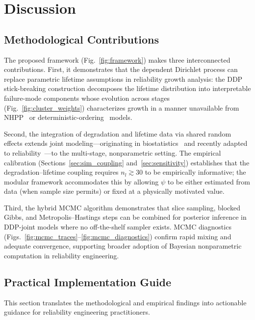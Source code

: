 \documentclass[a4paper,fleqn,longmktitle]{cas-sc}
\begin{document}
\section{Discussion}
\label{sec:disc}

\subsection{Methodological Contributions}

The proposed framework (Fig.~\ref{fig:framework}) makes three interconnected contributions. First, it demonstrates that the dependent Dirichlet process can replace parametric lifetime assumptions in reliability growth analysis: the DDP stick-breaking construction decomposes the lifetime distribution into interpretable failure-mode components whose evolution across stages (Fig.~\ref{fig:cluster_weights}) characterizes growth in a manner unavailable from NHPP~\cite{Crow1984} or deterministic-ordering~\cite{Liu2026a} models.

Second, the integration of degradation and lifetime data via shared random effects extends joint modeling---originating in biostatistics~\cite{Tsiatis2004,Rizopoulos2012} and recently adapted to reliability~\cite{Fu2024,Fard2025}---to the multi-stage, nonparametric setting. The empirical calibration (Sections~\ref{sec:sim_coupling} and~\ref{sec:sensitivity}) establishes that the degradation--lifetime coupling requires $n_l \gtrsim 30$ to be empirically informative; the modular framework accommodates this by allowing $\psi$ to be either estimated from data (when sample size permits) or fixed at a physically motivated value.

Third, the hybrid MCMC algorithm demonstrates that slice sampling, blocked Gibbs, and Metropolis--Hastings steps can be combined for posterior inference in DDP-joint models where no off-the-shelf sampler exists. MCMC diagnostics (Figs.~\ref{fig:mcmc_traces}--\ref{fig:mcmc_diagnostics}) confirm rapid mixing and adequate convergence, supporting broader adoption of Bayesian nonparametric computation in reliability engineering.

\subsection{Practical Implementation Guide}
\label{sec:practice}

This section translates the methodological and empirical findings into actionable guidance for reliability engineering practitioners.
\end{document}
